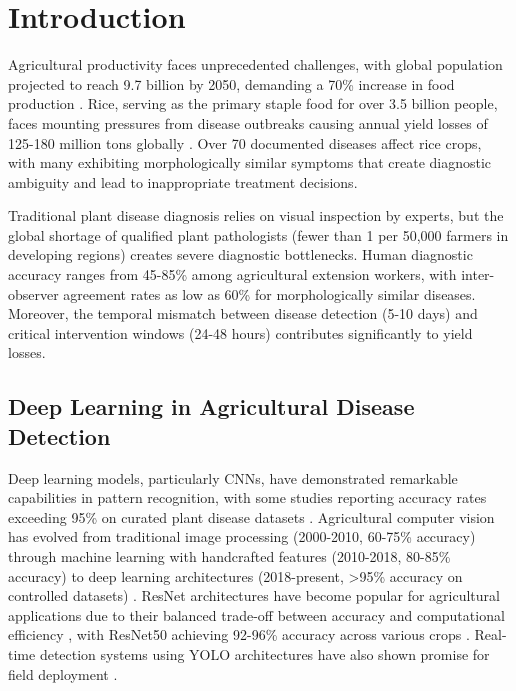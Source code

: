 \documentclass[agriculture,article,submit,pdftex,moreauthors]{Definitions/mdpi}
\begin{document}

\section{Introduction}

Agricultural productivity faces unprecedented challenges, with global population projected to reach 9.7 billion by 2050, demanding a 70\% increase in food production \cite{kamilaris2018deep}. Rice, serving as the primary staple food for over 3.5 billion people, faces mounting pressures from disease outbreaks causing annual yield losses of 125-180 million tons globally \cite{savary2019global,rahman2020deep}. Over 70 documented diseases affect rice crops, with many exhibiting morphologically similar symptoms that create diagnostic ambiguity and lead to inappropriate treatment decisions.

Traditional plant disease diagnosis relies on visual inspection by experts, but the global shortage of qualified plant pathologists (fewer than 1 per 50,000 farmers in developing regions) creates severe diagnostic bottlenecks. Human diagnostic accuracy ranges from 45-85\% among agricultural extension workers, with inter-observer agreement rates as low as 60\% for morphologically similar diseases. Moreover, the temporal mismatch between disease detection (5-10 days) and critical intervention windows (24-48 hours) contributes significantly to yield losses.

\subsection{Deep Learning in Agricultural Disease Detection}

Deep learning models, particularly CNNs, have demonstrated remarkable capabilities in pattern recognition, with some studies reporting accuracy rates exceeding 95\% on curated plant disease datasets \cite{mohanty2016using}. Agricultural computer vision has evolved from traditional image processing (2000-2010, 60-75\% accuracy) through machine learning with handcrafted features (2010-2018, 80-85\% accuracy) to deep learning architectures (2018-present, >95\% accuracy on controlled datasets) \cite{liakos2018machine,singh2023comparative}. ResNet architectures have become popular for agricultural applications due to their balanced trade-off between accuracy and computational efficiency \cite{he2016deep}, with ResNet50 achieving 92-96\% accuracy across various crops \cite{ferentinos2018deep}. Real-time detection systems using YOLO architectures have also shown promise for field deployment \cite{fuentes2017robust,liu2020yolo}.
\end{document}
